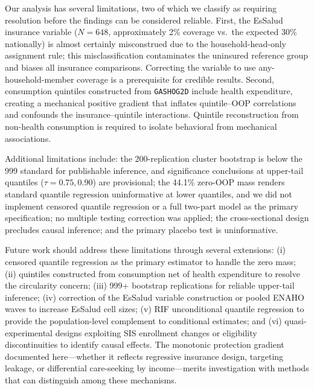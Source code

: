 Our analysis has several limitations, two of which we classify as requiring resolution before the findings can be considered reliable. First, the EsSalud insurance variable ($N = 648$, approximately 2\% coverage vs.\ the expected 30\% nationally) is almost certainly misconstrued due to the household-head-only assignment rule; this misclassification contaminates the uninsured reference group and biases all insurance comparisons. Correcting the variable to use any-household-member coverage is a prerequisite for credible results. Second, consumption quintiles constructed from \texttt{GASHOG2D} include health expenditure, creating a mechanical positive gradient that inflates quintile--OOP correlations and confounds the insurance--quintile interactions. Quintile reconstruction from non-health consumption is required to isolate behavioral from mechanical associations.

Additional limitations include: the 200-replication cluster bootstrap is below the 999 standard for publishable inference, and significance conclusions at upper-tail quantiles ($\tau = 0.75, 0.90$) are provisional; the 44.1\% zero-OOP mass renders standard quantile regression uninformative at lower quantiles, and we did not implement censored quantile regression \citep{Powell1986, Chernozhukov2002} or a full two-part model as the primary specification; no multiple testing correction was applied; the cross-sectional design precludes causal inference; and the primary placebo test is uninformative.

Future work should address these limitations through several extensions: (i) censored quantile regression \citep{Powell1986, Chernozhukov2002} as the primary estimator to handle the zero mass; (ii) quintiles constructed from consumption net of health expenditure to resolve the circularity concern; (iii) 999+ bootstrap replications for reliable upper-tail inference; (iv) correction of the EsSalud variable construction or pooled ENAHO waves to increase EsSalud cell sizes; (v) RIF unconditional quantile regression \citep{Firpo2009} to provide the population-level complement to conditional estimates; and (vi) quasi-experimental designs exploiting SIS enrollment changes or eligibility discontinuities to identify causal effects. The monotonic protection gradient documented here---whether it reflects regressive insurance design, targeting leakage, or differential care-seeking by income---merits investigation with methods that can distinguish among these mechanisms.
